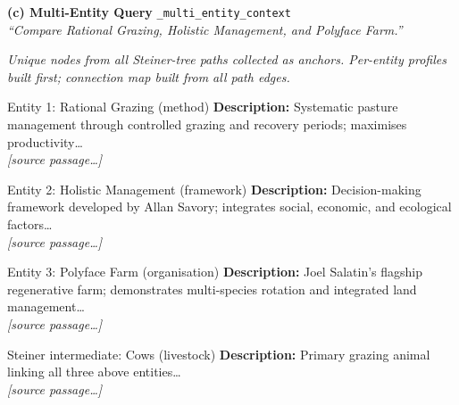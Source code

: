 \documentclass{article}
\newcommand{\passagemark}{\textit{\color{gray}\scriptsize [source passage\ldots]}}
\newcommand{\paneltitle}[3]{%
  \begin{tcolorbox}[
    colback=querybg, colframe=querybg,
    boxrule=0pt, arc=4pt, top=4pt, bottom=4pt, left=6pt, right=6pt]
    {\small\bfseries\sffamily\color{white} #1}
    \hfill{\tiny\sffamily\color{white!70}\texttt{#2}}\\[1pt]
    {\scriptsize\sffamily\color{white!85}\textit{``#3''}}
  \end{tcolorbox}%
}
\begin{document}
\begin{minipage}[t]{0.487\textwidth}

\paneltitle{(c) Multi-Entity Query}{\_multi\_entity\_context}{Compare Rational Grazing, Holistic Management, and Polyface Farm.}

\vspace{4pt}

{\scriptsize\sffamily\color{gray!60}
\textit{Unique nodes from all Steiner-tree paths collected as anchors.
Per-entity profiles built first; connection map built from all path edges.}}

\vspace{4pt}

\begin{multibox}{Entity 1: Rational Grazing \normalfont\color{gray}(method)}
\scriptsize\sffamily
\textbf{Description:} Systematic pasture management through controlled grazing
and recovery periods; maximises productivity\ldots\\
\passagemark
\end{multibox}

\vspace{3pt}

\begin{multibox}{Entity 2: Holistic Management \normalfont\color{gray}(framework)}
\scriptsize\sffamily
\textbf{Description:} Decision-making framework developed by Allan Savory;
integrates social, economic, and ecological factors\ldots\\
\passagemark
\end{multibox}

\vspace{3pt}

\begin{multibox}{Entity 3: Polyface Farm \normalfont\color{gray}(organisation)}
\scriptsize\sffamily
\textbf{Description:} Joel Salatin's flagship regenerative farm; demonstrates
multi-species rotation and integrated land management\ldots\\
\passagemark
\end{multibox}

\vspace{3pt}

\begin{multibox}{Steiner intermediate: Cows \normalfont\color{gray}(livestock)}
\scriptsize\sffamily
\textbf{Description:} Primary grazing animal linking all three above entities\ldots\\
\passagemark
\end{multibox}


\end{minipage}
\end{document}
